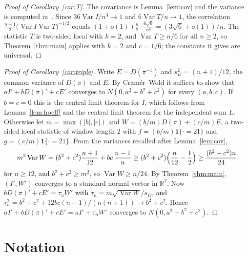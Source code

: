 \documentclass[11pt]{amsart}
\theoremstyle{remark}
\newcommand{\Var}{\operatorname{Var}}
\begin{document}
\begin{proof}[Proof of Corollary~\ref{cor:T}]
The covariance is Lemma~\ref{lem:cov} and the variance is computed in~\cite{CD}. Since $36\Var I/n^3\to1$ and
$6\Var T/n\to1$, the correlation $\frac{n-1}2\bigl(\Var I\Var T\bigr)^{-1/2}$ equals $(1+o(1))\frac n2\cdot\frac{6\sqrt6}{n^2}
=(3\sqrt6+o(1))/n$. The statistic $T$ is two-sided local with $k=2$, and $\Var T\ge n/6$ for all $n\ge2$, so
Theorem~\ref{thm:main} applies with $k=2$ and $c=1/6$; the constants it gives are universal.
\end{proof}

\begin{proof}[Proof of Corollary~\ref{cor:triple}]
Write $E=D(\pi^{-1})$ and $s_D^2=(n+1)/12$, the common variance of $D(\pi)$ and $E$. By Cramér--Wold it suffices to show
that $aI'+bD(\pi)'+cE'$ converges to $N(0,a^2+b^2+c^2)$ for every $(a,b,c)$. If $b=c=0$ this is the central limit
theorem for $I$, which follows from Lemma~\ref{lem:hoeff} and the central limit theorem for the independent sum $L$.
Otherwise let $m=\max(|b|,|c|)$ and $W=(b/m)D(\pi)+(c/m)E$, a two-sided local statistic of window length $2$ with
$f=(b/m)\mathbf 1\{\cdot=21\}$ and $g=(c/m)\mathbf 1\{\cdot=21\}$. From the variances recalled after
Lemma~\ref{lem:cov},
\[
m^2\Var W=(b^2+c^2)\frac{n+1}{12}+bc\,\frac{n-1}n\ge(b^2+c^2)\Bigl(\frac n{12}-\frac12\Bigr)\ge\frac{(b^2+c^2)n}{24}
\]
for $n\ge12$, and $b^2+c^2\ge m^2$, so $\Var W\ge n/24$. By Theorem~\ref{thm:main}, $(I',W')$ converges to a standard
normal vector in $\mathbb R^2$. Now $bD(\pi)'+cE'=\tau_nW'$ with $\tau_n=m\sqrt{\Var W}/s_D$, and
$\tau_n^2=b^2+c^2+12bc(n-1)/(n(n+1))\to b^2+c^2$. Hence $aI'+bD(\pi)'+cE'=aI'+\tau_nW'$ converges to
$N(0,a^2+b^2+c^2)$.
\end{proof}

\section*{Notation}
\end{document}
